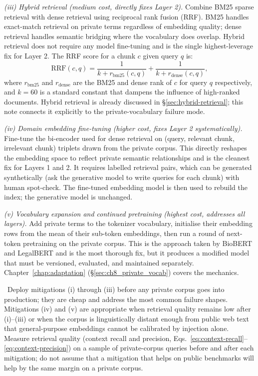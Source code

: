\emph{(iii) Hybrid retrieval (medium cost, directly fixes Layer 2).}
Combine BM25 sparse retrieval with dense retrieval using
reciprocal rank fusion (RRF). BM25 handles exact-match
retrieval on private terms regardless of embedding quality;
dense retrieval handles semantic bridging where the vocabulary
does overlap. Hybrid retrieval does not require any model
fine-tuning and is the single highest-leverage fix for Layer 2.
The RRF score for a chunk $c$ given query $q$ is:
\begin{equation}
  \mathrm{RRF}(c, q)
  = \frac{1}{k + r_{\mathrm{bm25}}(c,q)}
  + \frac{1}{k + r_{\mathrm{dense}}(c,q)},
  \label{eq:ch10-rrf}
\end{equation}
where $r_{\mathrm{bm25}}$ and $r_{\mathrm{dense}}$ are the
BM25 and dense rank of $c$ for query $q$ respectively, and
$k = 60$ is a standard constant that dampens the influence of
high-ranked documents. Hybrid retrieval is already discussed
in \S\ref{sec:hybrid-retrieval}; this note connects it
explicitly to the private-vocabulary failure mode.

\emph{(iv) Domain embedding fine-tuning (higher cost, fixes Layer 2
systematically).} Fine-tune the bi-encoder used for dense
retrieval on (query, relevant chunk, irrelevant chunk) triplets
drawn from the private corpus. This directly reshapes the
embedding space to reflect private semantic relationships and
is the cleanest fix for Layers 1 and 2. It requires labelled
retrieval pairs, which can be generated synthetically
(ask the generative model to write queries for each chunk)
with human spot-check. The fine-tuned embedding model is then
used to rebuild the index; the generative model is unchanged.

\emph{(v) Vocabulary expansion and continued pretraining (highest
cost, addresses all layers).} Add private terms to the
tokenizer vocabulary, initialise their embedding rows from the
mean of their sub-token embeddings, then run a round of
next-token pretraining on the private corpus. This is the
approach taken by BioBERT and LegalBERT and is the most
thorough fix, but it produces a modified model that must be
versioned, evaluated, and maintained separately. Chapter~\ref{chap:adaptation}
(\S\ref{sec:ch8_private_vocab}) covers the mechanics.

\Cons\ Deploy mitigations (i) through (iii) before any private
corpus goes into production; they are cheap and address the
most common failure shapes. Mitigations (iv) and (v) are
appropriate when retrieval quality remains low after (i)--(iii)
or when the corpus is linguistically distant enough from public
web text that general-purpose embeddings cannot be calibrated
by injection alone. Measure retrieval quality (context recall
and precision, Eqs.~\eqref{eq:context-recall}--\eqref{eq:context-precision})
on a sample of private-corpus queries before and after each
mitigation; do not assume that a mitigation that helps on
public benchmarks will help by the same margin on a private
corpus.

